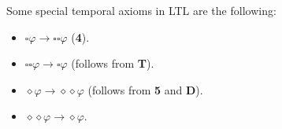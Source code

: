 Some special temporal axioms in LTL are the following:
\begin{itemize}
    \item $\square\varphi \rightarrow \square\square\varphi$ (\textbf{4}).
    \item $\square\square\varphi \rightarrow \square\varphi$ (follows from \textbf{T}).
    \item $\diamond\varphi \rightarrow \diamond\diamond\varphi$ (follows from \textbf{5} and \textbf{D}). 
    \item $\diamond\diamond\varphi \rightarrow \diamond\varphi$.
\end{itemize}

